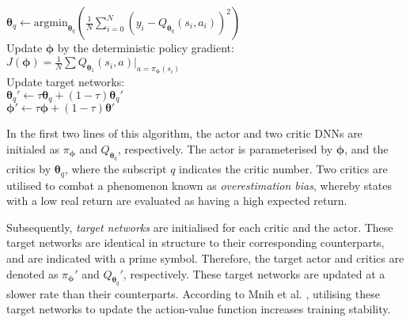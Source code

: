 \begin{algorithm}[hbt!]
{{        $\bm{\theta}_q \leftarrow \text{argmin}_{\bm{\theta}_q} ( \frac{1}{N} \sum_{i=0}^{N} (y_i - Q_{\bm{\theta}_q}(s_i,a_i))^{2} ) $ \\
        \vspace{0.5cm}
        {
            Update $\bm{\phi}$ by the deterministic policy gradient: \\ %
            \nonl $J(\bm{\phi}) = \frac{1}{N} \sum Q_{\bm{\theta}_1}(s_i,a) | _{a=\pi_{\bm{\phi}}(s_i)}$ \\
            Update target networks: \\
            $\bm{\theta}_{q}' \leftarrow \tau \bm{\theta}_q + (1 - \tau) \bm{\theta}_{q}'$ \\
            $\bm{\phi}' \leftarrow \tau \bm{\phi} + (1 - \tau) \bm{\theta}'$ \\
        }
    }
}
\end{algorithm}



In the first two lines of this algorithm, the actor and two critic DNNs are initialed as $\pi_{\bm{\phi}}$ and $Q_{\bm{\theta}_q}$, respectively.
The actor is parameterised by $\bm{\phi}$, and the critics by $\bm{\theta}_q$, where the subscript $q$ indicates the critic number.
Two critics are utilised to combat a phenomenon known as \emph{overestimation bias}, whereby states with a low real return are evaluated as having a high expected return. 


Subsequently, \emph{target networks} are initialised for each critic and the actor.
These target networks are identical in structure to their corresponding counterparts, and are indicated with a prime symbol.
Therefore, the target actor and critics are denoted as $\pi_{\bm{\phi}}'$ and $Q_{\bm{\theta}_q}'$, respectively.
These target networks are updated at a slower rate than their counterparts.
According to Mnih et al. \cite{mnih2013}, utilising these target networks to update the action-value function increases training stability.


